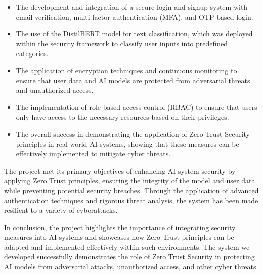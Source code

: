 \documentclass[a4paper,12pt]{article}
\begin{document}
\begin{itemize}
    \item The development and integration of a secure login and signup system with email verification, multi-factor authentication (MFA), and OTP-based login.
    \item The use of the DistilBERT model for text classification, which was deployed within the security framework to classify user inputs into predefined categories.
    \item The application of encryption techniques and continuous monitoring to ensure that user data and AI models are protected from adversarial threats and unauthorized access.
    \item The implementation of role-based access control (RBAC) to ensure that users only have access to the necessary resources based on their privileges.
    \item The overall success in demonstrating the application of Zero Trust Security principles in real-world AI systems, showing that these measures can be effectively implemented to mitigate cyber threats.
\end{itemize}

The project met its primary objectives of enhancing AI system security by applying Zero Trust principles, ensuring the integrity of the model and user data while preventing potential security breaches. Through the application of advanced authentication techniques and rigorous threat analysis, the system has been made resilient to a variety of cyberattacks.

In conclusion, the project highlights the importance of integrating security measures into AI systems and showcases how Zero Trust principles can be adapted and implemented effectively within such environments. The system we developed successfully demonstrates the role of Zero Trust Security in protecting AI models from adversarial attacks, unauthorized access, and other cyber threats.
\end{document}
